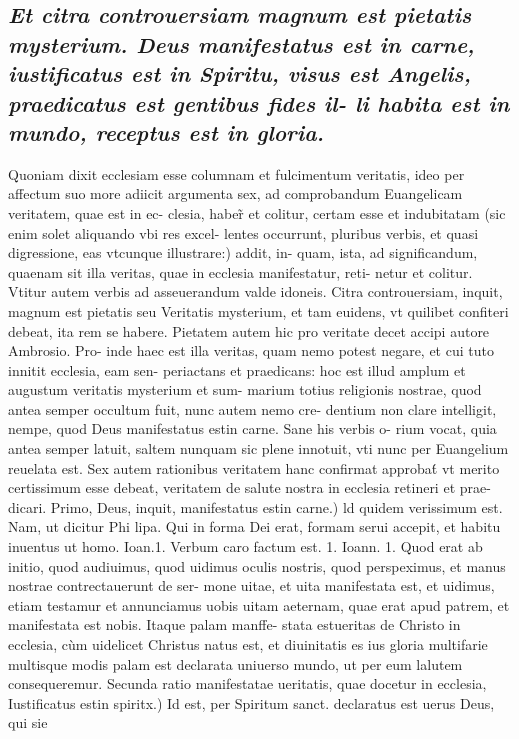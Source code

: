 \documentclass{article}
\begin{document}
\begin{pages}
\subsection*{\textit{Et citra controuersiam magnum est pietatis mysterium. Deus manifestatus est in carne, iustificatus est in Spiritu, visus est Angelis, praedicatus est gentibus fides il- li habita est in mundo, receptus est in gloria. }}\pstart Quoniam dixit ecclesiam esse columnam et fulcimentum veritatis, ideo per affectum suo more adiicit argumenta sex, ad comprobandum Euangelicam veritatem, quae est in ec- clesia, haber̃ et colitur, certam esse et indubitatam (sic enim solet aliquando vbi res excel- lentes occurrunt, pluribus verbis, et quasi digressione, eas vtcunque illustrare:) addit, in- quam, ista, ad significandum, quaenam sit illa veritas, quae in ecclesia manifestatur, reti- netur et colitur. Vtitur autem verbis ad asseuerandum valde idoneis. Citra controuersiam, inquit, magnum est pietatis seu Veritatis mysterium, et tam euidens, vt quilibet confiteri debeat, ita rem se habere. Pietatem autem hic pro veritate decet accipi autore Ambrosio. Pro- inde haec est illa veritas, quam nemo potest negare, et cui tuto innitit ecclesia, eam sen- periactans et praedicans: hoc est illud amplum et augustum veritatis mysterium et sum- marium totius religionis nostrae, quod antea semper occultum fuit, nunc autem nemo cre- dentium non clare intelligit, nempe, quod Deus manifestatus estin carne. Sane his verbis o- rium vocat, quia antea semper latuit, saltem nunquam sic plene innotuit, vti nunc per Euangelium reuelata est. Sex autem rationibus veritatem hanc confirmat approbat́ vt merito certissimum esse debeat, veritatem de salute nostra in ecclesia retineri et prae- dicari. Primo,  \pend\pstart Deus, inquit, manifestatus estin carne.) ld quidem verissimum est. Nam, ut dicitur Phi lipa. Qui in forma Dei erat, formam serui accepit, et habitu inuentus ut homo. Ioan.1. Verbum caro factum est. 1. Ioann. 1. Quod erat ab initio, quod audiuimus, quod uidimus oculis nostris, quod perspeximus, et manus nostrae contrectauerunt de ser- mone uitae, et uita manifestata est, et uidimus, etiam testamur et annunciamus uobis uitam aeternam, quae erat apud patrem, et manifestata est nobis. Itaque palam manffe- stata estueritas de Christo in ecclesia, cùm uidelicet Christus natus est, et diuinitatis es ius gloria multifarie multisque modis palam est declarata uniuerso mundo, ut per eum lalutem consequeremur.  \pend\pstart Secunda ratio manifestatae ueritatis, quae docetur in ecclesia, Iustificatus estin spiritx.) Id est, per Spiritum sanct. declaratus est uerus Deus, qui sie  \pend

\end{pages}
\end{document}
